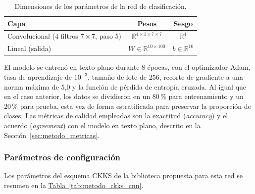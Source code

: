 \begin{table}[h]
    \centering
    \caption{Dimensiones de los parámetros de la red de clasificación.}\label{tab:arq_cnn}
    \vspace{0.5em}
    \begin{tabular}{| l | c | c |}
        \hline
        Capa & Pesos & Sesgo \\
        \hline
        Convolucional (4 filtros $7 \times 7$, paso 5) & $\mathbb{R}^{4 \times 1 \times 7 \times 7}$ & $\mathbb{R}^{4}$ \\
        \hline
        Lineal (salida) & $W \in \mathbb{R}^{10 \times 100}$ & $b \in \mathbb{R}^{10}$ \\
        \hline
    \end{tabular}
\end{table}

El modelo se entrenó en texto plano durante 8 épocas, con el optimizador Adam, tasa de aprendizaje de $10^{-3}$, tamaño de lote de 256, recorte de gradiente a una norma máxima de 5,0 y la función de pérdida de entropía cruzada. Al igual que en el caso anterior, los datos se dividieron en un 80\,\% para entrenamiento y un 20\,\% para prueba, esta vez de forma estratificada para preservar la proporción de clases. Las métricas de calidad empleadas son la exactitud (\textit{accuracy}) y el acuerdo (\textit{agreement}) con el modelo en texto plano, descrito en la Sección~\ref{sec:metodo_metricas}.

\subsubsection{Parámetros de configuración}

Los parámetros del esquema CKKS de la biblioteca propuesta para esta red se resumen en la \hyperref[tab:metodo_ckks_cnn]{Tabla~\ref{tab:metodo_ckks_cnn}}.

